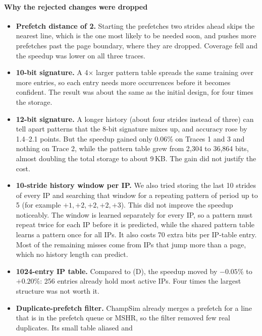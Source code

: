 \documentclass[11pt,a4paper]{article}
\begin{document}
  \paragraph{Why the rejected changes were dropped}
  \begin{itemize}
    \item \textbf{Prefetch distance of 2.} Starting the prefetches two
      strides ahead skips the nearest line, which is the one most likely
      to be needed soon, and pushes more prefetches past the page
      boundary, where they are dropped. Coverage fell and the speedup was
      lower on all three traces.
    \item \textbf{10-bit signature.} A 4$\times$ larger pattern table
      spreads the same training over more entries, so each entry needs
      more occurrences before it becomes confident. The result was about
      the same as the initial design, for four times the storage.
    \item \textbf{12-bit signature.} A longer history (about four strides
      instead of three) can tell apart patterns that the 8-bit signature
      mixes up, and accuracy rose by 1.4--2.1 points. But the speedup
      gained only 0.06\% on Traces 1 and 3 and nothing on Trace 2, while
      the pattern table grew from 2{,}304 to 36{,}864 bits, almost
      doubling the total storage to about 9\,KB. The gain did not justify
      the cost.
    \item \textbf{10-stride history window per IP.} We also tried storing
      the last 10 strides of every IP and searching that window for a
      repeating pattern of period up to 5 (for example
      $+1,+2,+2,+2,+3$). This did not improve the speedup noticeably.
      The window is learned separately for every IP, so a pattern must
      repeat twice for each IP before it is predicted, while the shared
      pattern table learns a pattern once for all IPs. It also costs
      70 extra bits per IP-table entry. Most of the remaining misses come
      from IPs that jump more than a page, which no history length can
      predict.
    \item \textbf{1024-entry IP table.} Compared to (D), the speedup moved
      by $-0.05\%$ to $+0.20\%$: 256 entries already hold most active
      IPs. Four times the largest structure was not worth it.
    \item \textbf{Duplicate-prefetch filter.} ChampSim already merges a
      prefetch for a line that is in the prefetch queue or MSHR, so the
      filter removed few real duplicates. Its small table aliased and

\end{itemize}
\end{document}
